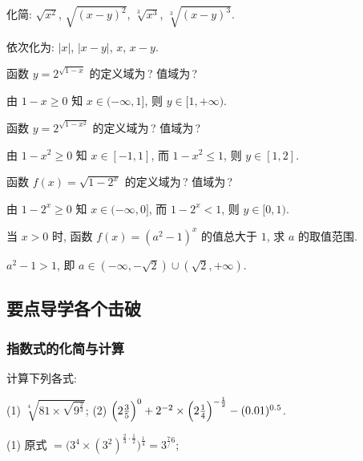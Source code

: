   \lianxi
  \begin{exercise}
    化简: $\sqrt{x^2}$, $\sqrt{(x-y)^2}$, $\sqrt[3]{x^3}$, $\sqrt[3]{(x-y)^3}$.
  \end{exercise}

  \beginsolution
    依次化为: $|x|$, $|x-y|$, $x$, $x-y$.
  \endsolution
  
  \begin{exercise}
    函数 $y= 2^{\sqrt{1-x}}$ 的定义域为\,? 值域为\,?
  \end{exercise}

  \beginsolution
    由 $1-x\geqslant 0$ 知 $x\in(-\infty,1]$, 则 $y\in[1,+\infty)$.
    
    \varexercise 函数 $y= 2^{\sqrt{1-x^2}}$ 的定义域为\,? 值域为\,?
    
    由 $1-x^2\geqslant 0$ 知 $x\in[-1,1]$, 而 $1-x^2\leqslant 1$, 则 $y\in[1,2]$.
  \endsolution
  
  \begin{exercise}
    函数 $f(x)= \sqrt{1-2^x}$ 的定义域为\,? 值域为\,?
  \end{exercise}

  \beginsolution
    由 $1-2^x\geqslant 0$ 知 $x\in(-\infty,0]$, 而 $1-2^x< 1$, 则 $y\in[0,1)$.
  \endsolution
  
  \begin{exercise}
    当 $x>0$ 时, 函数 $f(x)=(a^2 -1)^x$ 的值总大于 $1$, 求 $a$ 的取值范围.
  \end{exercise}

  \beginsolution
    $a^2-1>1$, 即 $a\in(-\infty,-\sqrt2)\cup(\sqrt2,+\infty)$.
  \endsolution
  
  \subsection{要点导学\quad 各个击破}
  \subsubsection{指数式的化简与计算}
  \begin{example}
    计算下列各式:
    
    (1) $\sqrt[4]{81\times \sqrt{9^\frac23}}$;\qquad
    (2) $\Bigl(2\frac35\Bigr)^0+ 
      2^{-2}\times \Bigl(2\frac14\Bigr)^{-\frac12} 
      -(0.01)^{0.5}$.
  \end{example}

  \beginsolution
    (1) 原式 $= \big(3^4\times(3^2)^{\frac23\cdot\frac12}\Big)^\frac14= 3^{\frac7/6}$;
    
